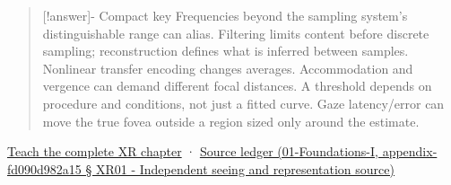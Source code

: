 \begin{quote}
{[}!answer{]}- Compact key Frequencies beyond the sampling system's distinguishable range can alias. Filtering limits content before discrete sampling; reconstruction defines what is inferred between samples. Nonlinear transfer encoding changes averages. Accommodation and vergence can demand different focal distances. A threshold depends on procedure and conditions, not just a fitted curve. Gaze latency/error can move the true fovea outside a region sized only around the estimate.
\end{quote}

\href{Continuous\%20Notes/University\%20-\%20Worlds,\%20Images\%20and\%20Inference\%20-\%20Graphics,\%20Vision\%20and\%20Photography\#Sampling\%20is\%20a\%20question\%20of\%20what\%20remains\%20distinguishable}{Teach the complete XR chapter} · \href{}{Source ledger (01-Foundations-I, appendix-fd090d982a15 § XR01 - Independent seeing and representation source)}
